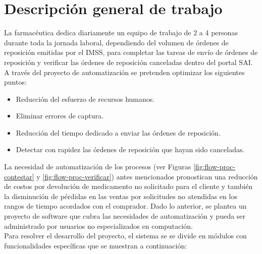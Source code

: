 \documentclass[a4paper,10pt]{article}
\begin{document}
\section{Descripción general de trabajo}
La farmacéutica dedica diariamente un equipo de trabajo de 2 a 4 personas durante toda la jornada laboral, dependiendo del volumen de órdenes de reposición emitidas por el IMSS, para completar las tareas de envío de órdenes de reposición y verificar las órdenes de reposición canceladas dentro del portal SAI. A través del proyecto de automatización se pretenden optimizar los siguientes puntos:
\begin{itemize}
\item Reducción del esfuerzo de recursos humanos.
\item Eliminar errores de captura.
\item Reducción del tiempo dedicado a enviar las órdenes de reposición.
\item Detectar con rapidez las órdenes de reposición que hayan sido canceladas.
\end{itemize}
La necesidad de automatización de los procesos (ver Figuras \ref{fig:flow-proc-contestar} y \ref{fig:flow-proc-verificar}) antes mencionados pronostican una reducción de costos por devolución de medicamento no solicitado para el cliente y también la disminución de pérdidas en las ventas por solicitudes no atendidas en los rangos de tiempo acordados con el comprador. Dado lo anterior, se plantea un proyecto de software que cubra las necesidades de automatización y pueda ser administrado por usuarios no especializados en computación.\\
Para resolver el desarrollo del proyecto, el sistema se se divide en módulos con funcionalidades específicas que se muestran a continuación:
\end{document}
